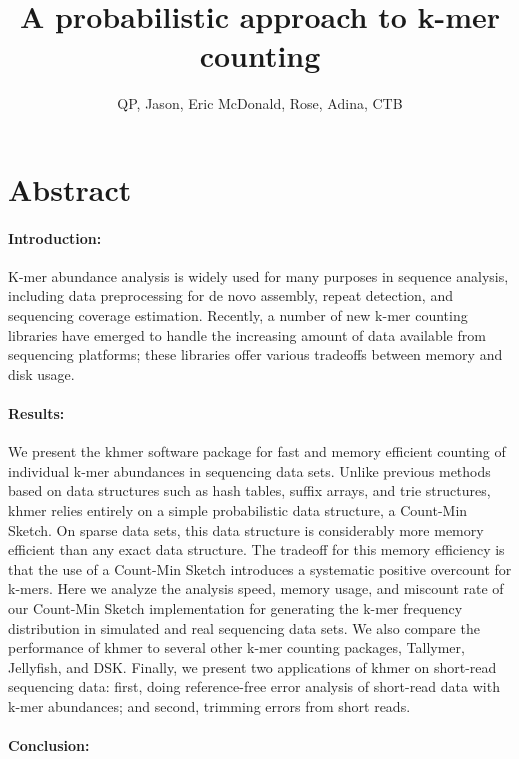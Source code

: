 \documentclass{article}
\title{A probabilistic approach to k-mer counting}
\author{QP, Jason, Eric McDonald, Rose, Adina, CTB}
\begin{document}

\maketitle

\section{Abstract}

\paragraph{Introduction:}

K-mer abundance analysis is widely used for many purposes in sequence
analysis, including data preprocessing for de novo assembly, repeat
detection, and sequencing coverage estimation.  Recently, a number of
new k-mer counting libraries have emerged to handle the increasing
amount of data available from sequencing platforms; these libraries
offer various tradeoffs between memory and disk usage.

\paragraph{Results:}

We present the khmer software package for fast and memory efficient
counting of individual k-mer abundances in sequencing data
sets. Unlike previous methods based on data structures such as hash
tables, suffix arrays, and trie structures, khmer relies entirely on a
simple probabilistic data structure, a Count-Min Sketch.  On sparse
data sets, this data structure is considerably more memory efficient
than any exact data structure.  The tradeoff for this memory
efficiency is that the use of a Count-Min Sketch introduces a
systematic positive overcount for k-mers.  Here we analyze the
analysis speed, memory usage, and miscount rate of our Count-Min
Sketch implementation for generating the k-mer frequency distribution
in simulated and real sequencing data sets.  We also compare the
performance of khmer to several other k-mer counting packages,
Tallymer, Jellyfish, and DSK.  Finally, we present two applications of
khmer on short-read sequencing data: first, doing reference-free error
analysis of short-read data with k-mer abundances; and second,
trimming errors from short reads.

\paragraph{Conclusion:}
\end{document}
